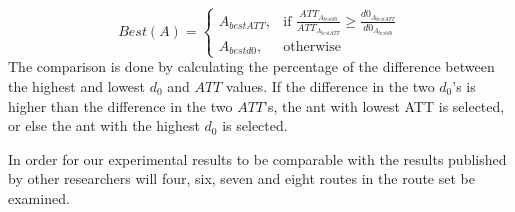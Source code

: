 \[
    Best(A)= 
\begin{cases}
    A_{bestATT},& \text{if } \frac{ATT_{A_{bestd0}}}{ATT_{A_{bestATT}}}\geq \frac{d0_{A_{bestATT}}}{d0_{A_{bestd0}}}\\
    A_{bestd0},& \text{otherwise}
\end{cases}
\]
The comparison is done by calculating the percentage of the difference between the highest and lowest $d_0$ and $ATT$ values. If the difference in the two $d_0$'s is higher than the difference in the two $ATT$'s, the ant with lowest ATT is selected, or else the ant with the highest $d_0$ is selected. %

In order for our experimental results to be comparable with the results published by other researchers will four, six, seven and eight routes in the route set be examined.








